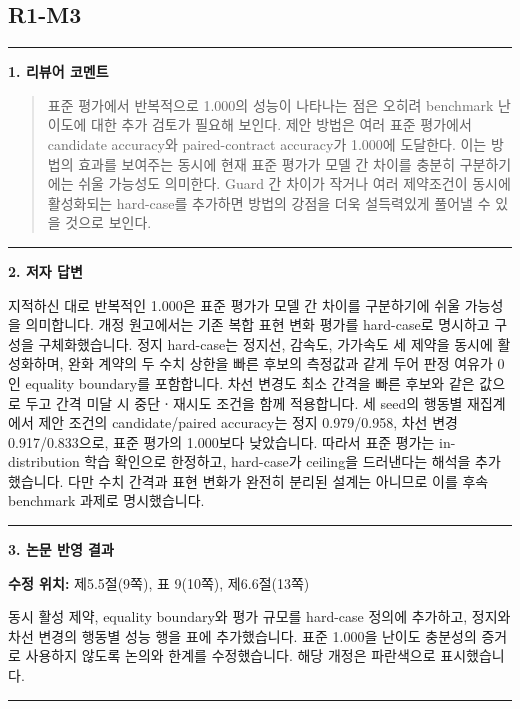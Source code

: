 \documentclass[11pt]{article}
\newcommand{\fieldheading}[2]{%
  \par\medskip\noindent
  {\color{#1}\rule{3pt}{1.25em}}\hspace{0.55em}\textbf{#2}\par\smallskip}
\newenvironment{reviewitem}[1]
  {\subsection*{#1}}
  {\par\medskip\hrule\bigskip}
\newenvironment{reviewercomment}
  {\fieldheading{reviewercolor}{1. 리뷰어 코멘트}%
   \begin{quote}}
  {\end{quote}}
\newenvironment{authorresponse}
  {\fieldheading{responsecolor}{2. 저자 답변}}
  {\par}
\newenvironment{manuscriptrevision}[1]
  {\fieldheading{revisioncolor}{3. 논문 반영 결과}%
   \textbf{수정 위치:} #1\par\smallskip}
  {\par}
\begin{document}
\begin{reviewitem}{R1-M3}
  \begin{reviewercomment}
    표준 평가에서 반복적으로 1.000의 성능이 나타나는 점은 오히려 benchmark
    난이도에 대한 추가 검토가 필요해 보인다. 제안 방법은 여러 표준 평가에서
    candidate accuracy와 paired-contract accuracy가 1.000에 도달한다. 이는 방법의
    효과를 보여주는 동시에 현재 표준 평가가 모델 간 차이를 충분히 구분하기에는
    쉬울 가능성도 의미한다. Guard 간 차이가 작거나 여러 제약조건이 동시에
    활성화되는 hard-case를 추가하면 방법의 강점을 더욱 설득력있게 풀어낼 수 있을
    것으로 보인다.
  \end{reviewercomment}

  \begin{authorresponse}
    지적하신 대로 반복적인 1.000은 표준 평가가 모델 간 차이를 구분하기에 쉬울
    가능성을 의미합니다. 개정 원고에서는 기존 복합 표현 변화 평가를 hard-case로
    명시하고 구성을 구체화했습니다. 정지 hard-case는 정지선, 감속도, 가가속도
    세 제약을 동시에 활성화하며, 완화 계약의 두 수치 상한을 빠른 후보의
    측정값과 같게 두어 판정 여유가 0인 equality boundary를 포함합니다. 차선
    변경도 최소 간격을 빠른 후보와 같은 값으로 두고 간격 미달 시 중단ㆍ재시도
    조건을 함께 적용합니다. 세 seed의 행동별 재집계에서 제안 조건의
    candidate/paired accuracy는 정지 0.979/0.958, 차선 변경 0.917/0.833으로,
    표준 평가의 1.000보다 낮았습니다. 따라서 표준 평가는 in-distribution 학습
    확인으로 한정하고, hard-case가 ceiling을 드러낸다는 해석을 추가했습니다.
    다만 수치 간격과 표현 변화가 완전히 분리된 설계는 아니므로 이를 후속
    benchmark 과제로 명시했습니다.
  \end{authorresponse}

  \begin{manuscriptrevision}{제5.5절(9쪽), 표 9(10쪽), 제6.6절(13쪽)}
    동시 활성 제약, equality boundary와 평가 규모를 hard-case 정의에 추가하고,
    정지와 차선 변경의 행동별 성능 행을 표에 추가했습니다. 표준 1.000을 난이도
    충분성의 증거로 사용하지 않도록 논의와 한계를 수정했습니다. 해당 개정은
    파란색으로 표시했습니다.
  \end{manuscriptrevision}
\end{reviewitem}
\end{document}
